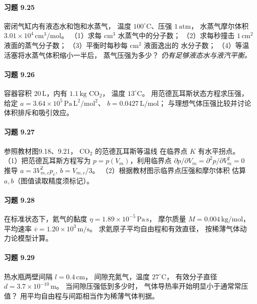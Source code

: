 \paragraph{习题 9.25}
密闭气缸内有液态水和饱和水蒸气，
温度 \(100^\circ\mathrm C\)、压强 \(1\,\mathrm{atm}\)，
水蒸气摩尔体积
\(3.01\times10^4\,\mathrm{cm^3/mol}\)。
（1）求每 \(\mathrm{cm^3}\) 水蒸气中的分子数；
（2）求每秒撞击 \(1\,\mathrm{cm^2}\) 液面的蒸气分子数；
（3）平衡时每秒每 \(\mathrm{cm^2}\) 液面逸出的
水分子数；
（4）等温活塞将水蒸气体积缩小一半后，
蒸气压强为多少？
\textit{仍有足够液态水与液汽平衡。}

\paragraph{习题 9.26}
容器容积 \(20\,\mathrm L\)，内有
\(1.1\,\mathrm{kg}\) \(\mathrm{CO_2}\)，
温度 \(13^\circ\mathrm C\)。
用范德瓦耳斯状态方程求压强，
给定
\(a=3.64\times10^5\,\mathrm{Pa\,L^2/mol^2}\)、
\(b=0.0427\,\mathrm{L/mol}\)；
与理想气体压强比较并讨论体积排斥和吸引效应。

\paragraph{习题 9.27}
参照教材图9.18、9.21，
\(\mathrm{CO_2}\) 的范德瓦耳斯等温线
在临界点 \(K\) 有水平拐点。
（1）把范德瓦耳斯方程写为
\(p=p(V_m)\)，利用临界点
\(\partial p/\partial V_m=
 \partial^2p/\partial V_m^2=0\)
推导
\(a=3V_{m,c}^2p_c,\ b=V_{m,c}/3\)。
（2）根据教材图示临界点压强和摩尔体积
估算 \(a,b\)（图值读取精度须标记）。

\paragraph{习题 9.28}
在标准状态下，氦气的黏度
\(\eta=1.89\times10^{-5}\,\mathrm{Pa\,s}\)，
摩尔质量
\(M=0.004\,\mathrm{kg/mol}\)，
平均速率
\(\overline v=1.20\times10^3\,\mathrm{m/s}\)。
求氦原子平均自由程和有效直径，
按稀薄气体动力论模型计算。

\paragraph{习题 9.29}
热水瓶两壁间隔
\(l=0.4\,\mathrm{cm}\)，
间隙充氮气，温度 \(27^\circ\mathrm C\)，
有效分子直径
\(d=3.7\times10^{-10}\,\mathrm m\)。
当间隙压强低到多少时，
气体导热率开始明显小于通常常压值？
用平均自由程与间距相当作为稀薄气体判据。
